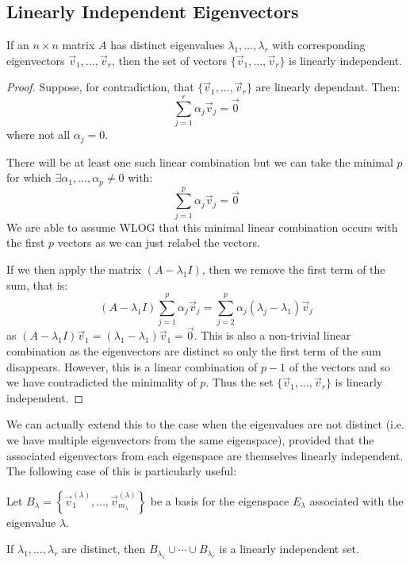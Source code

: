 \documentclass[../main.tex]{subfiles}
\begin{document}
\subsection{Linearly Independent Eigenvectors}
\begin{theorem}
  If an $n \times n$ matrix $A$ has distinct eigenvalues $\lambda_1, \ldots, \lambda_r$ with corresponding eigenvectors $\vec{v}_1, \ldots, \vec{v}_r$, then the set of vectors $\{\vec{v}_1, \ldots, \vec{v}_r\}$ is linearly independent. \label{linearlyIndependantEigenvectors}
\end{theorem}
\begin{proof}
  Suppose, for contradiction, that $\{\vec{v}_1, \ldots, \vec{v}_r\}$ are linearly dependant.
  Then:
  \[
    \sum_{j = 1}^{r} \alpha_j \vec{v}_j = \vec{0}
  \]
  where not all $\alpha_j = 0$.

  There will be at least one such linear combination but we can take the minimal $p$ for which $\exists \alpha_1, \ldots, \alpha_p \neq 0$ with:
  \[
    \sum_{j = 1}^{p} \alpha_j \vec{v}_j = \vec{0}
  \]
  We are able to assume WLOG that this minimal linear combination occurs with the first $p$ vectors as we can just relabel the vectors.

  If we then apply the matrix $(A - \lambda_1 I)$, then we remove the first term of the sum, that is:
  \[
    (A - \lambda_1 I) \sum_{j = 1}^{p} \alpha_j \vec{v}_j = \sum_{j = 2}^{p} \alpha_j(\lambda_j - \lambda_1)\vec{v}_j
  \]
  as $(A - \lambda_1 I)\vec{v}_1 = (\lambda_1 - \lambda_1)\vec{v}_1 = \vec{0}$.
  This is also a non-trivial linear combination as the eigenvectors are distinct so only the first term of the sum disappears.
  However, this is a linear combination of $p - 1$ of the vectors and so we have contradicted the minimality of $p$.
  Thus the set $\{\vec{v}_1, \ldots, \vec{v}_r\}$ is linearly independent.
\end{proof}
We can actually extend this to the case when the eigenvalues are not distinct (i.e. we have multiple eigenvectors from the same eigenspace), provided that the associated eigenvectors from each eigenspace are themselves linearly independent.
The following case of this is particularly useful:
\begin{corollary}
  Let $B_\lambda = \left\{\vec{v}^{(\lambda)}_1, \ldots, \vec{v}^{(\lambda)}_{m_{\lambda}}\right\}$ be a basis for the eigenspace $E_\lambda$ associated with the eigenvalue $\lambda$.

  If $\lambda_1, \ldots, \lambda_r$ are distinct, then $B_{\lambda_1} \cup \cdots \cup B_{\lambda_r}$ is a linearly independent set.
\end{corollary}
\end{document}
